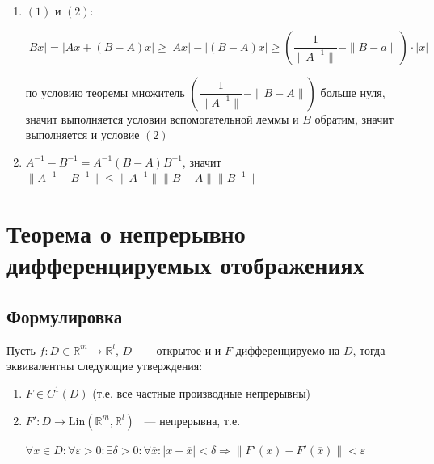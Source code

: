 \documentclass{article}
\begin{document}
            \begin{enumerate}
            
                \item $(1)$ и $(2)$:
                
                    $|Bx| = |Ax + (B - A)x| \geq |Ax| - |(B - A)x| \geq \left( \dfrac{1}{\| A^{-1} \|} - \| B - a \| \right) \cdot |x|$
                    
                    по условию теоремы множитель $\left( \dfrac{1}{\| A^{-1} \|} - \| B - A \|\right)$ больше нуля, значит выполняется условии вспомогательной леммы и $B$ обратим, значит выполняется и условие $(2)$
                    
                \item $A^{-1} - B^{-1} = A^{-1} (B - A) B^{-1}$, значит $\| A^{-1} - B^{-1} \| \leq \| A^{-1} \| \|B - A \| \| B^{-1} \|$
                    
            \end{enumerate}
            
    \newpage
    
    \section{Теорема о непрерывно дифференцируемых отображениях}
    
        \subsection{Формулировка}
        
            Пусть $f : D \in \mathbb{R}^m \rightarrow \mathbb{R}^l$, $D$ ~--- открытое и и $F$ дифференцируемо на $D$, тогда эквивалентны следующие утверждения:
            
            \begin{enumerate}
            
                \item $F \in C^1(D)$ (т.е. все частные производные непрерывны)
                
                \item $F' : D \rightarrow \mathrm{Lin} (\mathbb{R}^m, \mathbb{R}^l)$ ~--- непрерывна, т.е.
                
                    $\forall x \in D : \forall \varepsilon > 0 : \exists \delta > 0 : \forall \overline{x} : | x - \overline{x} | < \delta \Rightarrow \| F'(x) - F'(\overline{x}) \| < \varepsilon$
                    
            \end{enumerate}
            
\end{document}
